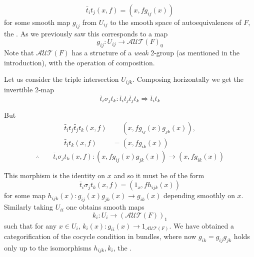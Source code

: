 \[ \bar{t}_i t_j(x,f)=(x,fg_{ij}(x))
\]
for some smooth map $g_{ij}$ from $U_{ij}$ to the smooth space of autoequivalences of $F$, the . As we previously saw this corresponds to a map \[ g_{ij}:U_{ij}\rightarrow \mathcal{AUT}(F)_0
	\]
Note that $\mathcal{AUT}(F)$ has a structure of a \emph{weak} 2-group (as mentioned in the introduction), with the operation of composition.

Let us consider the triple intersection $U_{ijk}$. Composing horizontally we get the invertible 2-map
\[
 \bar{t}_i\sigma_j t_k:\bar{t}_i  t_j\bar{t}_j t_k \Rightarrow \bar{t}_i t_k 
\]

But \begin{align*} 
         \bar{t}_i t_j \bar{t}_j t_k(x,f)&=(x,fg_{ij}(x)g_{jk}(x)),\\
         \bar{t}_i t_k  (x,f)&=(x,fg_{ik}(x))
    \end{align*}
 \[
      \therefore \qquad \bar{t}_i \sigma_j t_k(x,f):(x,fg_{ij}(x)g_{jk}(x))\rightarrow (x,fg_{ik}(x))
   \]

This morphism is the identity on $x$ and so it must be of the form\[ \bar{t}_i\sigma_j t_k(x,f)=(1_x,fh_{ijk}(x))\]
for some map  $h_{ijk}(x):g_{ij}(x)g_{jk}(x)\rightarrow g_{ik}(x)$ depending smoothly on $x$. Similarly taking $U_{ii}$ one obtains smooth maps \[k_i:U_i\rightarrow (\mathcal{AUT}(F))_1
\]
such that for any $x\in U_i$,  $k_i(x):g_{ii}(x)\rightarrow 1_{\mathcal{AUT}(F)}$.
We have obtained a categorification of the cocycle condition in bundles, where now $g_{ik}=g_{ij}g_{jk}$ holds only up to the isomorphisms $h_{ijk},k_{i}$, the .


